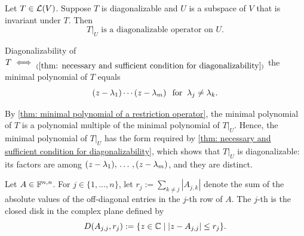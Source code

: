 \setcounter{thm}{64}
\begin{thm}
  \label{thm: restriction of diagonalizable operator to invariant subspace}
  Let $T\in \mathcal{L}(V)$. Suppose $T$ is diagonalizable and $U$ is a subspace of $V$ that is invariant under $T$. Then
  \begin{equation}
    \left.T\right|_U \text{ is a diagonalizable operator on } U.
  \end{equation}
\end{thm}
\begin{prf}
  Diagonalizability of $T \iff_{(\ref{thm: necessary and sufficient condition for diagonalizability})}$ the minimal polynomial of $T$ equals
  \begin{equation}
    (z-\lambda_1)\cdots(z-\lambda_m) \;\;\, \text{for}\;\; \lambda_j \neq  \lambda_k.
  \end{equation}

  By \ref{thm: minimal polynomial of a restriction operator}, the minimal polynomial of $T$ is a polynomial multiple of the minimal polynomial of $\left.T\right|_U$.
  Hence, the minimal polynomial of $\left.T\right|_U$ has the form required by \ref{thm: necessary and sufficient condition for diagonalizability}, which shows that $\left.T\right|_U$ is diagonalizable: its factors are among $(z-\lambda_1), {\, \ldots \,\,}, (z-\lambda_m)$, and they are distinct.
\end{prf}

\setcounter{thm}{65}
\begin{mydef}
  \label{def: gershgorin disk}
  Let $A \in \mathbb{F}^{n,n}$. For $j \in \{1, \dots, n\}$, let $r_j := \sum_{k \neq j} |A_{j,k}|$ denote the sum of the absolute values of the off-diagonal entries in the $j$-th row of $A$. The $j$-th  is the closed disk in the complex plane defined by
  \begin{equation}
    D(A_{j,j}, r_j) := \{ z \in \mathbb{C} \mid |z - A_{j,j}| \leq r_j \}.
  \end{equation}
\end{mydef}

